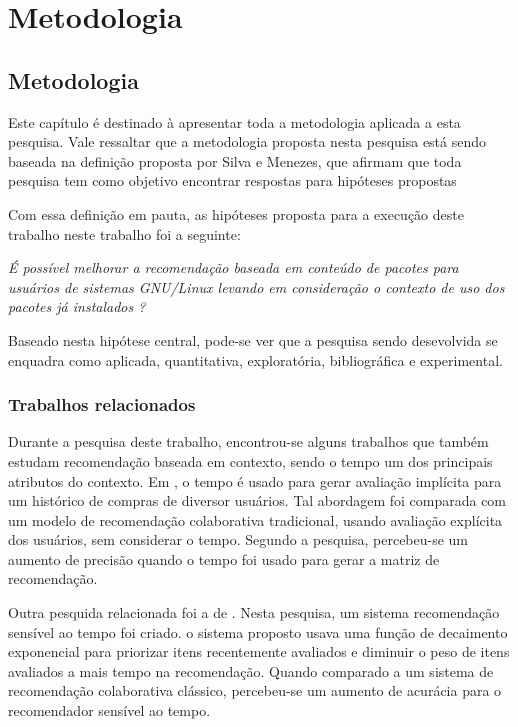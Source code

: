 \part{Metodologia}

\chapter[Metodologia]{Metodologia}

Este capítulo é destinado à apresentar toda a metodologia aplicada a esta
pesquisa. Vale ressaltar que a metodologia proposta nesta pesquisa está sendo
baseada na definição proposta por Silva e Menezes, que afirmam que toda pesquisa
tem como objetivo encontrar respostas para hipóteses propostas
\cite{da2005metodologia}

Com essa definição em pauta, as hipóteses proposta para a execução deste trabalho neste trabalho foi a seguinte:

\begin{center}
\textit{É possível melhorar a recomendação baseada em conteúdo de pacotes para
usuários de sistemas GNU/Linux levando em consideração o contexto de uso dos pacotes já instalados ?}
\end{center}

Baseado nesta hipótese central, pode-se ver que a pesquisa sendo desevolvida se
enquadra como aplicada, quantitativa, exploratória, bibliográfica e
experimental.


\section{Trabalhos relacionados}

Durante a pesquisa deste trabalho, encontrou-se alguns trabalhos que também estudam recomendação baseada em contexto, sendo o tempo um dos
principais atributos do contexto. Em \cite{lee2008time}, o tempo é usado para gerar avaliação implícita para um histórico de
compras de diversor usuários. Tal abordagem foi comparada com um modelo de recomendação colaborativa tradicional, usando avaliação explícita dos usuários,
sem considerar o tempo. Segundo a pesquisa, percebeu-se um aumento de precisão quando o tempo foi usado para gerar a matriz de recomendação.

Outra pesquida relacionada foi a de \cite{ding2005time}. Nesta pesquisa, um sistema recomendação sensível ao tempo foi criado. o sistema proposto usava uma função de
decaimento exponencial para priorizar itens recentemente avaliados e diminuir o peso de itens avaliados a mais tempo na recomendação. Quando comparado a um sistema de
recomendação colaborativa clássico, percebeu-se um aumento de acurácia para o recomendador sensível ao tempo.

